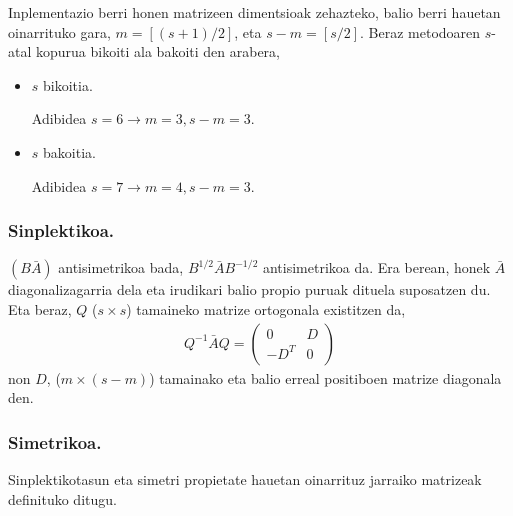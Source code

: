 Inplementazio berri honen matrizeen dimentsioak zehazteko, balio berri hauetan oinarrituko gara,
$m=[(s+1)/2]$, eta $s-m =[s/2]$. Beraz metodoaren $s$-atal kopurua bikoiti ala bakoiti den arabera,
\begin{itemize}
\item $s$ bikoitia.

Adibidea $s=6 \rightarrow m=3,s-m=3$.

\item $s$ bakoitia.

Adibidea $s=7 \rightarrow m=4, s-m=3$.
\end{itemize}


\subsubsection*{Sinplektikoa.}

$(B \bar{A})$ antisimetrikoa bada, $B^{1/2}\bar{A}B^{-1/2}$ antisimetrikoa da. Era berean, honek $\bar{A}$ diagonalizagarria dela eta irudikari balio propio puruak dituela suposatzen du. Eta beraz,  $Q$ ($s \times s$) tamaineko matrize ortogonala existitzen da,
\begin{align}
\label{eq:syb}
Q^{-1}\bar{A}Q=
\left(
\begin{matrix}
0 & D \\
-D^T & 0
\end{matrix}
\right)
\end{align}
non $D$, ($m \times (s-m)$) tamainako eta balio erreal positiboen matrize diagonala den. 

\subsubsection*{Simetrikoa.}

Sinplektikotasun eta simetri propietate hauetan oinarrituz jarraiko matrizeak definituko ditugu.

